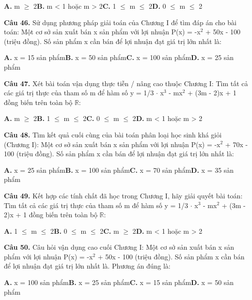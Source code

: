\documentclass[11pt,a4paper]{article}
\begin{document}
\hspace*{1.5em}\textbf{A.} m $\ge$ 2\quad\quad \textbf{B.} m < 1 hoặc m > 2\quad\quad \textbf{C.} 1 $\le$ m $\le$ 2\quad\quad \textbf{D.} 0 $\le$ m $\le$ 2\par\vspace{2pt}
\textbf{\color{primary} Câu 46.} Sử dụng phương pháp giải toán của Chương I để tìm đáp án cho bài toán: Một cơ sở sản xuất bán x sản phẩm với lợi nhuận P(x) = -x$^2$ + 50x - 100 (triệu đồng). Số sản phẩm x cần bán để lợi nhuận đạt giá trị lớn nhất là:\par
\hspace*{1.5em}\textbf{A.} x = 15 sản phẩm\quad\quad \textbf{B.} x = 50 sản phẩm\quad\quad \textbf{C.} x = 100 sản phẩm\quad\quad \textbf{D.} x = 25 sản phẩm\par\vspace{2pt}
\textbf{\color{primary} Câu 47.} Xét bài toán vận dụng thực tiễn / nâng cao thuộc Chương I: Tìm tất cả các giá trị thực của tham số m để hàm số y = 1/3 $\cdot$ x$^3$ - mx$^2$ + (3m - 2)x + 1 đồng biến trên toàn bộ $\mathbb{R}$:\par
\hspace*{1.5em}\textbf{A.} m $\ge$ 2\quad\quad \textbf{B.} 1 $\le$ m $\le$ 2\quad\quad \textbf{C.} 0 $\le$ m $\le$ 2\quad\quad \textbf{D.} m < 1 hoặc m > 2\par\vspace{2pt}
\textbf{\color{primary} Câu 48.} Tìm kết quả cuối cùng của bài toán phân loại học sinh khá giỏi (Chương I): Một cơ sở sản xuất bán x sản phẩm với lợi nhuận P(x) = -x$^2$ + 70x - 100 (triệu đồng). Số sản phẩm x cần bán để lợi nhuận đạt giá trị lớn nhất là:\par
\hspace*{1.5em}\textbf{A.} x = 25 sản phẩm\quad\quad \textbf{B.} x = 100 sản phẩm\quad\quad \textbf{C.} x = 70 sản phẩm\quad\quad \textbf{D.} x = 35 sản phẩm\par\vspace{2pt}
\textbf{\color{primary} Câu 49.} Kết hợp các tính chất đã học trong Chương I, hãy giải quyết bài toán: Tìm tất cả các giá trị thực của tham số m để hàm số y = 1/3 $\cdot$ x$^3$ - mx$^2$ + (3m - 2)x + 1 đồng biến trên toàn bộ $\mathbb{R}$:\par
\hspace*{1.5em}\textbf{A.} 1 $\le$ m $\le$ 2\quad\quad \textbf{B.} 0 $\le$ m $\le$ 2\quad\quad \textbf{C.} m $\ge$ 2\quad\quad \textbf{D.} m < 1 hoặc m > 2\par\vspace{2pt}
\textbf{\color{primary} Câu 50.} Câu hỏi vận dụng cao cuối Chương I: Một cơ sở sản xuất bán x sản phẩm với lợi nhuận P(x) = -x$^2$ + 50x - 100 (triệu đồng). Số sản phẩm x cần bán để lợi nhuận đạt giá trị lớn nhất là. Phương án đúng là:\par
\hspace*{1.5em}\textbf{A.} x = 100 sản phẩm\quad\quad \textbf{B.} x = 25 sản phẩm\quad\quad \textbf{C.} x = 15 sản phẩm\quad\quad \textbf{D.} x = 50 sản phẩm\par\vspace{2pt}
\end{document}
